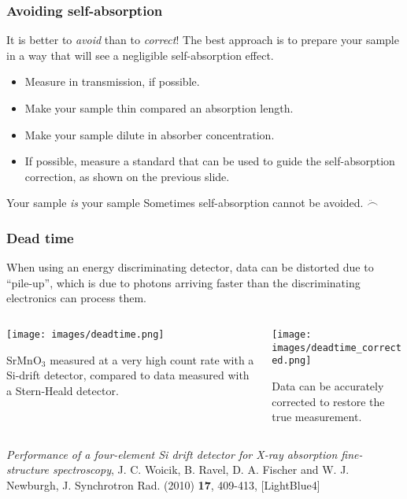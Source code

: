 \documentclass[10pt, xcolor=x11names, compress]{beamer}
\begin{document}
\begin{frame}[label=selfabs]
  \frametitle{Avoiding self-absorption}
  \begin{alertblock}{It is better to \textit{avoid} than to \textit{correct}!}
    The best approach is to prepare your sample in a way that will see
    a negligible self-absorption effect.
  \end{alertblock}

  \begin{itemize}
  \item Measure in transmission, if possible.
  \item Make your sample thin compared an absorption length.
  \item Make your sample dilute in absorber concentration.
  \item If possible, measure a standard that can be used to guide the
    self-absorption correction, as shown on the previous slide.
  \end{itemize}

  \begin{block}{Your sample \textit{is} your sample}
    Sometimes self-absorption cannot be avoided. $\ddot\frown$
  \end{block}
\end{frame}

\begin{frame}
  \frametitle{Dead time}

  \small
  When using an energy discriminating detector, data can be distorted
  due to ``pile-up'', which is due to photons arriving faster than the
  discriminating electronics can process them.
  \begin{columns}[T]
    \begin{column}{0.5\linewidth}
      \begin{center}
        \texttt{[image: images/deadtime.png]}

        SrMnO$_3$ measured at a very high count rate with a
        {\color{Red2}Si-drift detector}, compared to data measured
        with {\color{Blue2}a Stern-Heald detector}.
      \end{center}
    \end{column}
    \begin{column}{0.5\linewidth}
      \begin{center}
        \texttt{[image: images/deadtime\_corrected.png]}

        Data can be accurately corrected to restore the true measurement.
      \end{center}
    \end{column}
  \end{columns}
  \begin{bottomnote}[0.5][18.5]
    \textit{Performance of a four-element Si drift detector for X-ray
      absorption fine-structure spectroscopy}, J. C. Woicik, B. Ravel,
    D. A. Fischer and W. J. Newburgh, J. Synchrotron Rad. (2010)
    \textbf{17}, 409-413,
    [LightBlue4]
  \end{bottomnote}
\end{frame}
\end{document}
